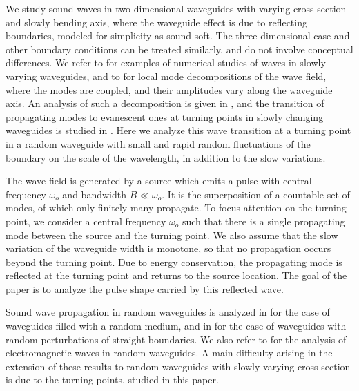 \documentclass[final]{siamltex}
\begin{document}
We study sound waves in two-dimensional waveguides with varying
cross section and slowly bending axis, where the waveguide effect is
due to reflecting boundaries, modeled for simplicity as sound
soft. The three-dimensional case and other boundary conditions can be
treated similarly, and do not involve conceptual differences.  We
refer to \cite{hazard2008improved,maurel2014propagation} for examples
of numerical studies of waves in slowly varying waveguides, and to
\cite{marcuse2013theory} for local mode decompositions of the wave
field, where the modes are coupled, and their amplitudes vary along
the waveguide axis.  An analysis of such a decomposition is
given in \cite{ahluwalia1974asymptotic,ting1983wave}, and the
transition of propagating modes to evanescent ones at turning points
in slowly changing waveguides is studied in
\cite{anyanwu1978asymptotic}.  Here we analyze this wave transition at
a turning point in a random waveguide with small and rapid random
fluctuations of the boundary on the scale of the wavelength, in
addition to the slow variations.

The wave field is generated by a source which emits a pulse with
central frequency ${\omega}_o$ and bandwidth $B\ll {\omega}_o$. It is the
superposition of a countable set of modes, of which only finitely many
propagate. To focus attention on the turning point, we consider a central frequency ${\omega}_o$ 
such that there is a single propagating mode between the source and the turning point. We
also assume that the slow variation of the waveguide width is
monotone, so that no propagation occurs beyond the turning point.  Due
to energy conservation, the propagating mode is reflected at the
turning point and returns to the source location. The goal of the
paper is to analyze the pulse shape carried by this reflected wave.

Sound wave propagation in random waveguides is analyzed in
\cite{kohler77,dozier1978statistics,garnier_papa,garnier_single,gomez} for the case
of waveguides filled with a random medium, and in
\cite{alonso2011wave,borcea2014paraxial,gomez2011wave} for the case of
waveguides with random perturbations of straight boundaries.  We also
refer to \cite{marcuse2013theory,alonso2015electromagnetic} for the
analysis of electromagnetic waves in random waveguides.  A main
difficulty arising in the extension of these results to random
waveguides with slowly varying cross section is due to the turning
points, studied in this paper.
\end{document}
